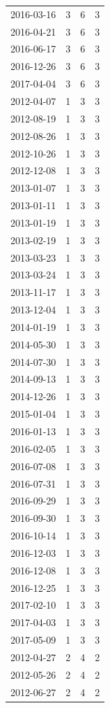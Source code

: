 \begin{tabular}{lrrr}
2016-03-16 & 3 & 6 & 3 \\
2016-04-21 & 3 & 6 & 3 \\
2016-06-17 & 3 & 6 & 3 \\
2016-12-26 & 3 & 6 & 3 \\
2017-04-04 & 3 & 6 & 3 \\
2012-04-07 & 1 & 3 & 3 \\
2012-08-19 & 1 & 3 & 3 \\
2012-08-26 & 1 & 3 & 3 \\
2012-10-26 & 1 & 3 & 3 \\
2012-12-08 & 1 & 3 & 3 \\
2013-01-07 & 1 & 3 & 3 \\
2013-01-11 & 1 & 3 & 3 \\
2013-01-19 & 1 & 3 & 3 \\
2013-02-19 & 1 & 3 & 3 \\
2013-03-23 & 1 & 3 & 3 \\
2013-03-24 & 1 & 3 & 3 \\
2013-11-17 & 1 & 3 & 3 \\
2013-12-04 & 1 & 3 & 3 \\
2014-01-19 & 1 & 3 & 3 \\
2014-05-30 & 1 & 3 & 3 \\
2014-07-30 & 1 & 3 & 3 \\
2014-09-13 & 1 & 3 & 3 \\
2014-12-26 & 1 & 3 & 3 \\
2015-01-04 & 1 & 3 & 3 \\
2016-01-13 & 1 & 3 & 3 \\
2016-02-05 & 1 & 3 & 3 \\
2016-07-08 & 1 & 3 & 3 \\
2016-07-31 & 1 & 3 & 3 \\
2016-09-29 & 1 & 3 & 3 \\
2016-09-30 & 1 & 3 & 3 \\
2016-10-14 & 1 & 3 & 3 \\
2016-12-03 & 1 & 3 & 3 \\
2016-12-08 & 1 & 3 & 3 \\
2016-12-25 & 1 & 3 & 3 \\
2017-02-10 & 1 & 3 & 3 \\
2017-04-03 & 1 & 3 & 3 \\
2017-05-09 & 1 & 3 & 3 \\
2012-04-27 & 2 & 4 & 2 \\
2012-05-26 & 2 & 4 & 2 \\
2012-06-27 & 2 & 4 & 2 \\

\end{tabular}
